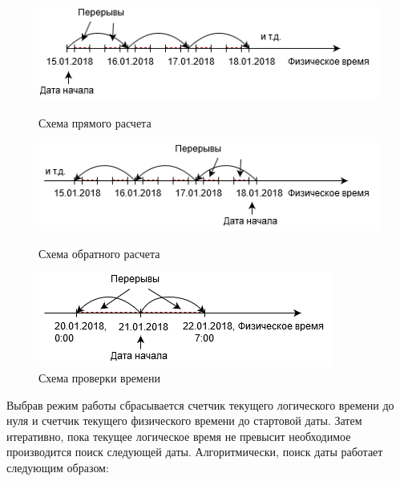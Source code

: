 \begin{figure}[h]
	\includegraphics[width=\linewidth]{pics/scheduleStraightCalc.png}
	\caption{Схема прямого расчета}
	\label{fig:straightCalc}
	\centering
	\includegraphics[width=\linewidth]{pics/scheduleReverceCalc.png}
	\caption{Схема обратного расчета}
	\label{fig:reverceCalc}
	\centering
	\includegraphics[width=\linewidth]{pics/scheduleCheckCalc.png}
	\caption{Схема проверки времени}
	\label{fig:checkCalc}
	\centering
\end{figure}

\indent Выбрав режим работы сбрасывается счетчик текущего логического времени до нуля и счетчик текущего физического времени до стартовой даты. Затем итеративно, пока текущее логическое время не превысит необходимое производится поиск следующей даты.
Алгоритмически, поиск даты работает следующим образом:


